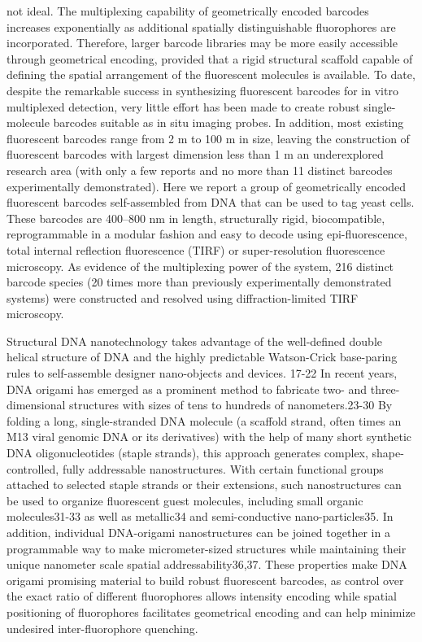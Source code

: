 not ideal. The multiplexing capability of geometrically encoded barcodes increases 
exponentially as additional spatially distinguishable fluorophores are incorporated. 
Therefore, larger barcode libraries may be more easily accessible through geometrical 
encoding, provided that a rigid structural scaffold capable of defining the spatial 
arrangement of the fluorescent molecules is available. To date, despite the remarkable 
success in synthesizing fluorescent barcodes for in vitro multiplexed detection, very little 
effort has been made to create robust single-molecule barcodes suitable as in situ imaging 
probes. In addition, most existing fluorescent barcodes range from 2 \textmu m to 100 \textmu m in 
size, leaving the construction of fluorescent barcodes with largest dimension less than 1 
\textmu m an underexplored research area (with only a few reports  \citep{li_multiplexed_2005,lin_self-assembled_2007,li_controlled_2010,levsky_single-cell_2002} and no more than 11 
distinct barcodes experimentally demonstrated). Here we report a group of geometrically 
encoded fluorescent barcodes self-assembled from DNA that can be used to tag yeast 
cells. These barcodes are 400–800 nm in length, structurally rigid, biocompatible, 
reprogrammable in a modular fashion and easy to decode using epi-fluorescence, total internal reflection fluorescence (TIRF) or 
super-resolution fluorescence microscopy. As evidence of the multiplexing power of the 
system, 216 distinct barcode species (20 times more than previously experimentally 
demonstrated systems) were constructed and resolved using diffraction-limited TIRF 
microscopy. 


Structural DNA nanotechnology takes advantage of the well-defined double 
helical structure of DNA and the highly predictable Watson-Crick base-paring rules to 
self-assemble designer nano-objects and devices. 17-22 In recent years, DNA origami has 
emerged as a prominent method to fabricate two- and three-dimensional structures with 
sizes of tens to hundreds of nanometers.23-30 By folding a long, single-stranded DNA 
molecule (a scaffold strand, often times an M13 viral genomic DNA or its derivatives) 
with the help of many short synthetic DNA oligonucleotides (staple strands), this 
approach generates complex, shape-controlled, fully addressable nanostructures. With 
certain functional groups attached to selected staple strands or their extensions, such 
nanostructures can be used to organize fluorescent guest molecules, including small 
organic molecules31-33 as well as metallic34 and semi-conductive nano-particles35. In 
addition, individual DNA-origami nanostructures can be joined together in a 
programmable way to make micrometer-sized structures while maintaining their unique 
nanometer scale spatial addressability36,37. These properties make DNA origami 
promising material to build robust fluorescent barcodes, as control over the exact ratio of 
different fluorophores allows intensity encoding while spatial positioning of fluorophores 
facilitates geometrical encoding and can help minimize undesired inter-fluorophore 
quenching. 






